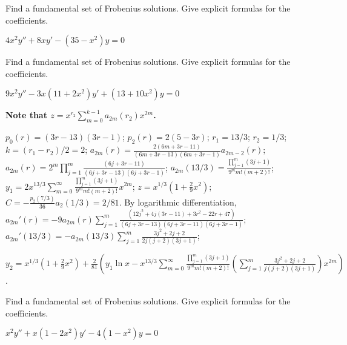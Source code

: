 \documentclass{ximera}
\begin{document}
\begin{problem}\label{exer:7.7.31}
Find
a fundamental set  of Frobenius solutions. Give explicit formulas for
the coefficients.

$4x^2y''+8xy'-(35-x^2)y=0$
\end{problem}

\begin{problem}\label{exer:7.7.32}
Find
a fundamental set  of Frobenius solutions. Give explicit formulas for
the coefficients.

$9x^2y''-3x(11+2x^2)y'+(13+10x^2)y=0$

\begin{solution}
    \textbf{Note that $z=x^{r_2}\sum_{m=0}^{k-1}a_{2m}(r_2)x^{2m}$.}

    $p_0(r)=(3r-13)(3r-1)$;
$p_2(r)=2(5-3r)$;
$r_1=13/3$; $r_2=1/3$; $k=(r_1-r_2)/2=2$;
$a_{2m}(r)=\frac{2(6m+3r-11)}{(6m+3r-13)(6m+3r-1)}a_{2m-2}(r)$;
$a_{2m}(r)=2^m\prod_{j=1}^m\frac{(6j+3r-11)}{(6j+3r-13)(6j+3r-1)}$;
$a_{2m}(13/3)=\frac{\prod_{j=1}^m(3j+1) }{9^mm!(m+2)!}$;
$y_1=2x^{13/3}\sum_{m=0}^\infty\frac{\prod_{j=1}^m(3j+1)
}{9^mm!(m+2)!}x^{2m}$;
$z=x^{1/3}\left(1+\frac{2}{9}x^2\right)$;
$C=-\frac{p_2(7/3)}{36}a_2(1/3)=2/81$.
By logarithmic differentiation,
$a_{2m}'(r)=-9a_{2m}(r)\sum_{j=1}^m
\frac{(12j^2+4j(3r-11)+3r^2-22r+47)}{(6j+3r-13)(6j+3r-11)(6j+3r-1)}$;
$a_{2m}'(13/3)=-
a_{2m}(13/3)\sum_{j=1}^m\frac{3j^2+2j+2}{2j(j+2)(3j+1)}$;

$y_2=x^{1/3}\left(1+\frac{2}{9}x^2\right)+\frac{2}{81}\left(
y_1\ln
x-x^{13/3}\sum_{m=0}^\infty\frac{\prod_{j=1}^m(3j+1)}{9^mm!(m+2)!}
\left(\sum_{j=1}^m\frac{3j^2+2j+2}{ j(j+2)(3j+1)}\right)x^{2m}\right)$.
\end{solution}
\end{problem}

\begin{problem}\label{exer:7.7.33}
Find
a fundamental set  of Frobenius solutions. Give explicit formulas for
the coefficients.

$x^2y''+x(1-2x^2)y'-4(1-x^2)y=0$
\end{problem}
\end{document}
